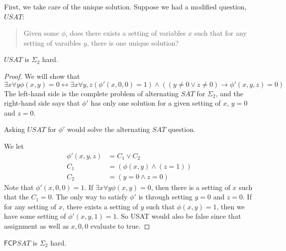 \documentclass[runningheads,a4paper]{llncs}
\begin{document}
First, we take care of the unique solution. Suppose we had a modified question, $USAT$:
\begin{quote} 
Given some $\phi$, does there exists a setting of variables $x$ such that for any setting of varaibles $y$, there is one unique solution? 
\end{quote}

\begin{lemma}
$USAT$ is $\Sigma_2$ hard.
\end{lemma}

\begin{proof}
We will show that 
\[ \exists x \forall y \phi(x,y) = 0 \leftrightarrow \exists x \forall y, z \left(\phi'(x, 0, 0) = 1 \right) \wedge \left((y \neq 0 \vee z \neq 0 ) \rightarrow \phi'(x, y, z) = 0 \right) \]
The left-hand side is the complete problem of alternating $SAT$ for $\Sigma_2$, and the right-hand side says that $\phi'$ has only one solution for a given setting of $x$, $y=0$ and $z =0$. 

Asking $USAT$ for $\phi'$ would solve the alternating $SAT$ question. 

We let 
\begin{align}
\phi'(x, y, z) &= C_1 \vee C_2 \\
		    C_1 &=\left(\phi(x, y) \wedge (z = 1)\right) \\
		   C_2 &=  \left( y = 0 \wedge z = 0 \right) 
\end{align}
Note that $\phi'(x, 0, 0) = 1$. If $\exists x \forall y \phi(x, y)= 0$, then there is a setting of $x$ such that the $C_1 = 0$. The only way to satisfy $\phi'$ is through setting $y = 0$ and $z = 0$. If for any setting of $x$, there exists a setting of $y$ such that $\phi(x, y) = 1$, then we have some setting of $\phi'(x, y, 1) = 1$. So USAT would also be false since that assignment as well as $x, 0, 0$ evaluate to true.
\end{proof}

\begin{proposition}
\label{prop:fcpsatsigmacomp}
$\mathsf{FCP} SAT$ is $\Sigma_2$ hard.
\end{proposition}
\end{document}
